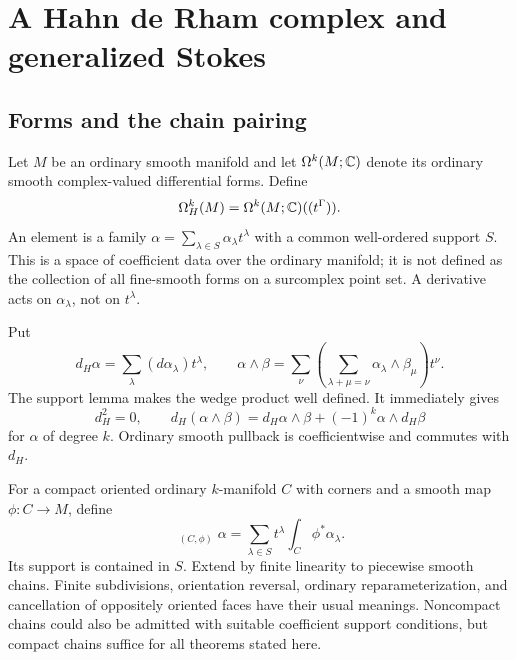 \documentclass[11pt,letterpaper]{article}
\theoremstyle{definition}
\theoremstyle{remark}
\newcommand{\HInt}{\mathop{\int^{\!H}}\nolimits}
\numberwithin{equation}{section}
\begin{document}
\section{A Hahn de Rham complex and generalized Stokes}\label{sec:stokes}

\subsection{Forms and the chain pairing}
Let $M$ be an ordinary smooth manifold and let $\Omega^k(M;\mathbb C)$ denote its ordinary smooth complex-valued differential forms. Define
\begin{equation}\label{eq:hahnforms}
 \Omega_H^k(M)=\Omega^k(M;\mathbb C)((t^\Gamma)).
\end{equation}
An element is a family $\alpha=\sum_{\lambda\in S}\alpha_\lambda t^\lambda$ with a common well-ordered support $S$. This is a space of coefficient data over the ordinary manifold; it is not defined as the collection of all fine-smooth forms on a surcomplex point set. A derivative acts on $\alpha_\lambda$, not on $t^\lambda$.

Put
\[
 d_H\alpha=\sum_\lambda(d\alpha_\lambda)t^\lambda,\qquad
 \alpha\wedge\beta=\sum_\nu\left(\sum_{\lambda+\mu=\nu}
 \alpha_\lambda\wedge\beta_\mu\right)t^\nu.
\]
The support lemma makes the wedge product well defined. It immediately gives
\[
 d_H^2=0,\qquad
 d_H(\alpha\wedge\beta)=d_H\alpha\wedge\beta+(-1)^k\alpha\wedge d_H\beta
\]
for $\alpha$ of degree $k$. Ordinary smooth pullback is coefficientwise and commutes with $d_H$.

For a compact oriented ordinary $k$-manifold $C$ with corners and a smooth map $\phi:C\to M$, define
\begin{equation}\label{eq:chainintegral}
 \HInt_{(C,\phi)}\alpha
 =\sum_{\lambda\in S}t^\lambda\int_C\phi^*\alpha_\lambda.
\end{equation}
Its support is contained in $S$. Extend by finite linearity to piecewise smooth chains. Finite subdivisions, orientation reversal, ordinary reparameterization, and cancellation of oppositely oriented faces have their usual meanings. Noncompact chains could also be admitted with suitable coefficient support conditions, but compact chains suffice for all theorems stated here.
\end{document}
